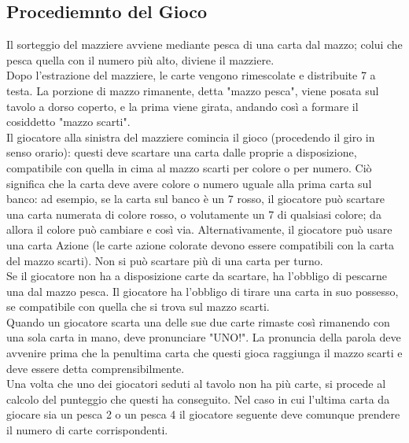 		\subsection{Procediemnto del Gioco}
			Il sorteggio del mazziere avviene mediante pesca di una carta dal mazzo; colui che pesca quella con il numero più alto, diviene il mazziere.	\\
			Dopo l'estrazione del mazziere, le carte vengono rimescolate e distribuite 7 a testa. La porzione di mazzo rimanente, detta "mazzo pesca", viene posata sul tavolo a dorso coperto, e la prima viene girata, andando così a formare il cosiddetto "mazzo scarti".\\
			Il giocatore alla sinistra del mazziere comincia il gioco (procedendo il giro in senso orario): questi deve scartare una carta dalle proprie a disposizione, compatibile con quella in cima al mazzo scarti per colore o per numero. Ciò significa che la carta deve avere colore o numero uguale alla prima carta sul banco: ad esempio, se la carta sul banco è un 7 rosso, il giocatore può scartare una carta numerata di colore rosso, o volutamente un 7 di qualsiasi colore; da allora il colore può cambiare e così via. Alternativamente, il giocatore può usare una carta Azione (le carte azione colorate devono essere compatibili con la carta del mazzo scarti). Non si può scartare più di una carta per turno.\\
			Se il giocatore non ha a disposizione carte da scartare, ha l'obbligo di pescarne una dal mazzo pesca. Il giocatore ha l'obbligo di tirare una carta in suo possesso, se compatibile con quella che si trova sul mazzo scarti. \\
			Quando un giocatore scarta una delle sue due carte rimaste così rimanendo con una sola carta in mano, deve pronunciare "UNO!". La pronuncia della parola deve avvenire prima che la penultima carta che questi gioca raggiunga il mazzo scarti e deve essere detta comprensibilmente.\\
			Una volta che uno dei giocatori seduti al tavolo non ha più carte, si procede al calcolo del punteggio che questi ha conseguito. Nel caso in cui l'ultima carta da giocare sia un pesca 2 o un pesca 4 il giocatore seguente deve comunque prendere il numero di carte corrispondenti.
		
